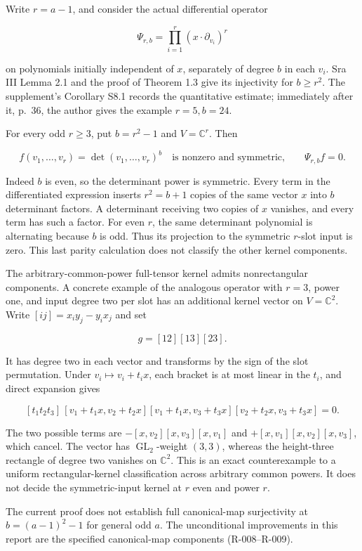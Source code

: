 \documentclass[
  10pt,
]{article}
\begin{document}
Write \(r=a-1\), and consider the actual differential operator

\[
 \Psi_{r,b}=\prod_{i=1}^r(x\cdot\partial_{v_i})^r
\]

on polynomials initially independent of \(x\), separately of degree
\(b\) in each \(v_i\). Sra III Lemma 2.1 and the proof of Theorem 1.3
give its injectivity for \(b\ge r^2\). The supplement's Corollary S8.1
records the quantitative estimate; immediately after it, p.~36, the
author gives the example \(r=5,b=24\).

For every odd \(r\ge3\), put \(b=r^2-1\) and \(V=\mathbb C^r\). Then

\[
 f(v_1,\ldots,v_r)=\det(v_1,\ldots,v_r)^b
 \quad\text{is nonzero and symmetric,}\qquad \Psi_{r,b}f=0.
 \tag{R-010a}
\]

Indeed \(b\) is even, so the determinant power is symmetric. Every term
in the differentiated expression inserts \(r^2=b+1\) copies of the same
vector \(x\) into \(b\) determinant factors. A determinant receiving two
copies of \(x\) vanishes, and every term has such a factor. For even
\(r\), the same determinant polynomial is alternating because \(b\) is
odd. Thus its projection to the symmetric \(r\)-slot input is zero. This
last parity calculation does not classify the other kernel components.

The arbitrary-common-power full-tensor kernel admits nonrectangular
components. A concrete example of the analogous operator with \(r=3\),
power one, and input degree two per slot has an additional kernel vector
on \(V=\mathbb C^2\). Write \([ij]=x_i y_j-y_i x_j\) and set

\[
 g=[12][13][23].
\]

It has degree two in each vector and transforms by the sign of the slot
permutation. Under \(v_i\mapsto v_i+t_i x\), each bracket is at most
linear in the \(t_i\), and direct expansion gives

\[
 [t_1t_2t_3]\,
 [v_1+t_1x,v_2+t_2x]
 [v_1+t_1x,v_3+t_3x]
 [v_2+t_2x,v_3+t_3x]=0.
 \tag{R-010b}
\]

The two possible terms are \(-[x,v_2][x,v_3][x,v_1]\) and
\(+[x,v_1][x,v_2][x,v_3]\), which cancel. The vector has
\(\operatorname{GL}_2\)-weight \((3,3)\), whereas the height-three
rectangle of degree two vanishes on \(\mathbb C^2\). This is an exact
counterexample to a uniform rectangular-kernel classification across
arbitrary common powers. It does not decide the symmetric-input kernel
at \(r\) even and power \(r\).

The current proof does not establish full canonical-map surjectivity at
\(b=(a-1)^2-1\) for general odd \(a\). The unconditional improvements in
this report are the specified canonical-map components (R-008--R-009).
\end{document}
